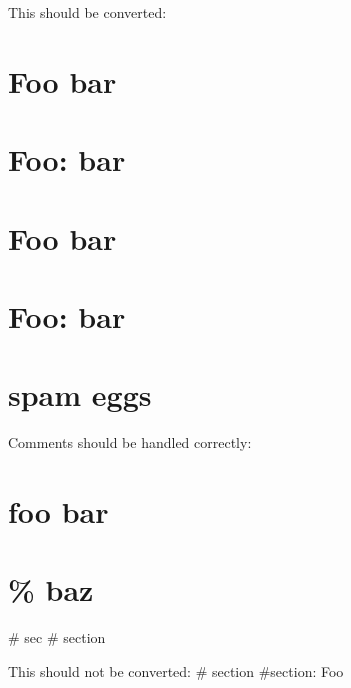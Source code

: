 This should be converted:
\section{Foo bar}
\section{Foo: bar}
\section[Foo bar]{Foo bar}
\section[Foo: bar]{Foo: bar}

\section*{spam eggs}

Comments should be handled correctly:
\section{foo bar} %
\section{\% baz} %
# sec%
# section %

This should not be converted:
# section
#section: Foo
